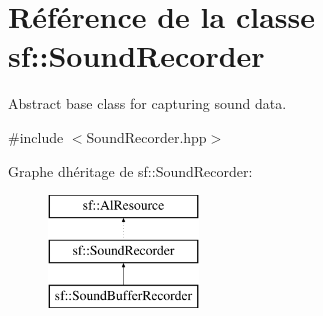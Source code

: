 \hypertarget{classsf_1_1SoundRecorder}{}\section{Référence de la classe sf\+:\+:Sound\+Recorder}
\label{classsf_1_1SoundRecorder}


Abstract base class for capturing sound data.  




{\ttfamily \#include $<$Sound\+Recorder.\+hpp$>$}

Graphe d\textquotesingle{}héritage de sf\+:\+:Sound\+Recorder\+:\begin{figure}[H]
\begin{center}
\leavevmode
\includegraphics[height=3.000000cm]{classsf_1_1SoundRecorder}
\end{center}
\end{figure}
